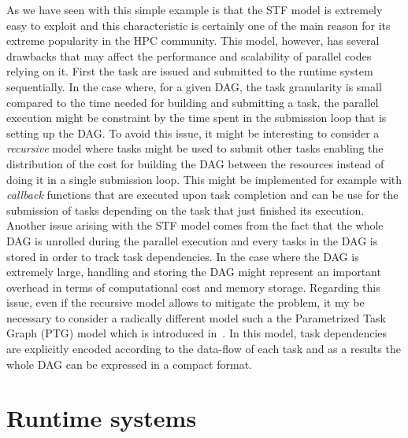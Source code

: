 \documentclass{article}
\begin{document}
As we have seen with this simple example is that the STF model is
extremely easy to exploit and this characteristic is certainly one of
the main reason for its extreme popularity in the HPC community. This
model, however, has several drawbacks that may affect the performance
and scalability of parallel codes relying on it. First the task are
issued and submitted to the runtime system sequentially. In the case
where, for a given DAG, the task granularity is small compared to the
time needed for building and submitting a task, the parallel execution
might be constraint by the time spent in the submission loop that is
setting up the DAG. To avoid this issue, it might be interesting to
consider a \textit{recursive} model where tasks might be used to
submit other tasks enabling the distribution of the cost for building
the DAG between the resources instead of doing it in a single
submission loop. This might be implemented for example with
\textit{callback} functions that are executed upon task completion and
can be use for the submission of tasks depending on the task that just
finished its execution. Another issue arising with the STF model comes
from the fact that the whole DAG is unrolled during the parallel
execution and every tasks in the DAG is stored in order to track task
dependencies. In the case where the DAG is extremely large, handling
and storing the DAG might represent an important overhead in terms of
computational cost and memory storage. Regarding this issue, even if
the recursive model allows to mitigate the problem, it my be necessary
to consider a radically different model such a the Parametrized Task
Graph (PTG) model which is introduced in~\cite{c.l:95}. In this model,
task dependencies are explicitly encoded according to the data-flow of
each task and as a results the whole DAG can be expressed in a compact
format. 


\section{Runtime systems}\label{sec:runtime}
\setcounter{equation}{0}
\setcounter{table}{0}
\setcounter{figure}{0}
\end{document}
